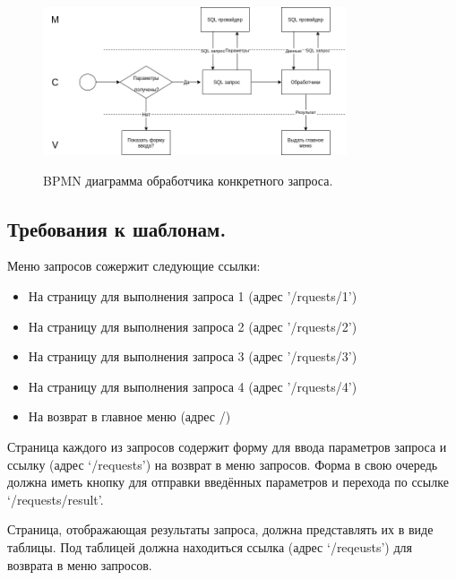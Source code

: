 \documentclass[12pt, a4paper]{article}
\begin{document}
    \begin{figure}[ht!]
    	\centering    %
    	\includegraphics[width=0.8\textwidth]{pictures/Handler_BPMN.png}
    	\label{fig:pic5} %
    	\caption{BPMN диаграмма обработчика конкретного запроса.}
    \end{figure}
    
    \subsection{Требования к шаблонам.}
    Меню запросов сожержит следующие ссылки:
    \begin{itemize}
    	\item На страницу для выполнения запроса 1 (адрес '/rquests/1')
    	\item На страницу для выполнения запроса 2 (адрес '/rquests/2')
    	\item На страницу для выполнения запроса 3 (адрес '/rquests/3')
    	\item На страницу для выполнения запроса 4 (адрес '/rquests/4')
    	\item На возврат в главное меню (адрес /)
    \end{itemize}

    Страница каждого из запросов содержит форму для ввода параметров запроса и ссылку
    (адрес ‘/requests’) на возврат в меню запросов. Форма в свою очередь должна иметь кнопку
    для отправки введённых параметров и перехода по ссылке ‘/requests/result’.
    
    Страница, отображающая результаты запроса, должна представлять их в виде таблицы. Под
    таблицей должна находиться ссылка (адрес ‘/reqeusts’) для возврата в меню запросов.
    
\end{document}
